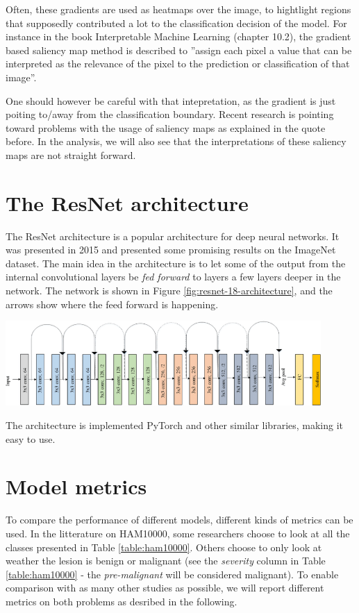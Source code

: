 Often, these gradients are used as heatmaps over the image, to hightlight regions that
supposedly contributed a lot to the classification decision of the model.
For instance in the book Interpretable Machine Learning (chapter 10.2)\cite{interpretable-machine-learning}, the gradient based
saliency map method is described to
''assign each pixel a value that can be interpreted as the relevance of the pixel to the prediction or classification of that image''.

One should however be careful with that intepretation, as the gradient is just poiting to/away from the classification boundary.
Recent research is pointing toward problems with the usage of saliency maps as explained in the quote before\cite{false-hope}.
In the analysis, we will also see that the interpretations of these saliency maps are not straight forward.

\section{The ResNet architecture}
The ResNet architecture is a popular architecture for deep neural networks.
It was presented in 2015 and presented some promising results on the ImageNet dataset\cite{RESNET-paper}.
The main idea in the architecture is to let some of the output from the internal convolutional layers
be \textit{fed forward} to layers a few layers deeper in the network.
The network is shown in Figure \ref{fig:resnet-18-architecture},
and the arrows show where the feed forward is happening.

\begin{center}
    \includegraphics[width=0.9\textwidth]{images/ResNet-18-architecture.png}
    \label{fig:resnet-18-architecture}
\end{center}


The architecture is implemented PyTorch\cite{PyTorch} and other similar libraries, making it easy to use.

\section{Model metrics} \label{sec:model_metrics}
To compare the performance of different models, different kinds of metrics can be used.
In the litterature on HAM10000, some researchers choose to look at all the classes presented
in Table \ref{table:ham10000}.
Others choose to only look at weather the lesion is benign or malignant
(see the \textit{severity} column in Table \ref{table:ham10000} - the \textit{pre-malignant} will be considered malignant).
To enable comparison with as many other studies as possible, we will report different metrics
on both problems as desribed in the following.
